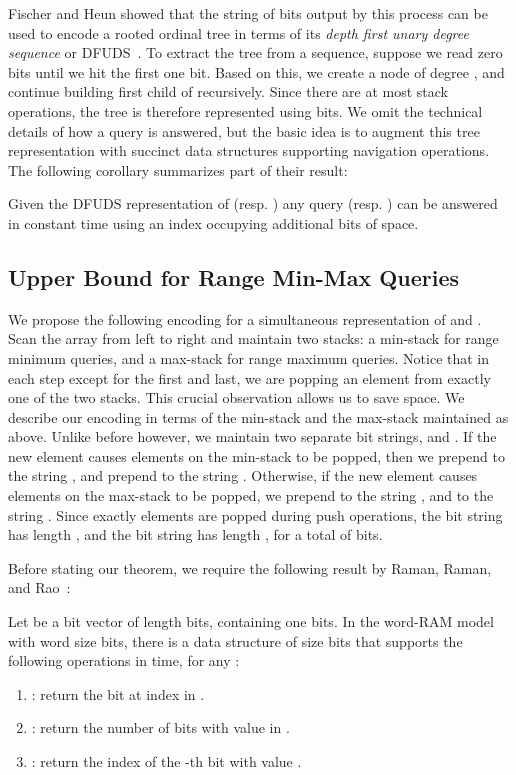\documentclass[runningheads]{llncs}
\begin{document}
Fischer and Heun showed that the string of bits output by this process
can be used to encode a rooted ordinal tree in terms of its
\emph{depth first unary degree sequence} or DFUDS~\cite{FH11}.  To
extract the tree from a sequence, suppose we read  zero bits until
we hit the first one bit.  Based on this, we create a node  of
degree , and continue building first child of  recursively.
Since there are at most  stack operations, the tree is therefore
represented using  bits.  We omit the technical details of how a
query is answered, but the basic idea is to augment this tree
representation with succinct data structures supporting navigation
operations.  The following corollary summarizes part of their result:

\begin{lemma}\label{lem:aux-index}
Given the DFUDS representation of  (resp. ) any
query  (resp. ) can be
answered in constant time using an index occupying  additional bits of space.
\end{lemma}

\subsection{Upper Bound for Range Min-Max Queries}

We propose the following encoding for a simultaneous representation of
 and .  Scan the array from left to right and
maintain two stacks: a min-stack for range minimum queries, and a
max-stack for range maximum queries.  Notice that in each step except
for the first and last, we are popping an element from exactly one of
the two stacks.  This crucial observation allows us to save space.  We
describe our encoding in terms of the min-stack and the max-stack
maintained as above.  Unlike before however, we maintain two separate
bit strings,  and . If the new element causes 
elements on the min-stack to be popped, then we prepend
 to the string , and prepend  to the string .
Otherwise, if the new element causes  elements on the
max-stack to be popped, we prepend  to the string ,
and  to the string .  Since exactly  elements are popped
during  push operations, the bit string  has length , and
the bit string  has length , for a total of  bits.

Before stating our theorem, we require the following result by Raman,
Raman, and Rao~\cite{RRR07}:

\begin{lemma}\label{lem:rrr} Let  be a
  bit vector of length  bits, containing  one bits.  In the
  word-RAM model with word size  bits, there is a data
  structure of size  bits that
  supports the following operations in  time, for any :
\begin{enumerate}
\item : return the bit at index  in .
\item : return the number of bits with
  value  in .
\item : return the index of the -th
  bit with value .
\end{enumerate}
\end{lemma}
\end{document}
